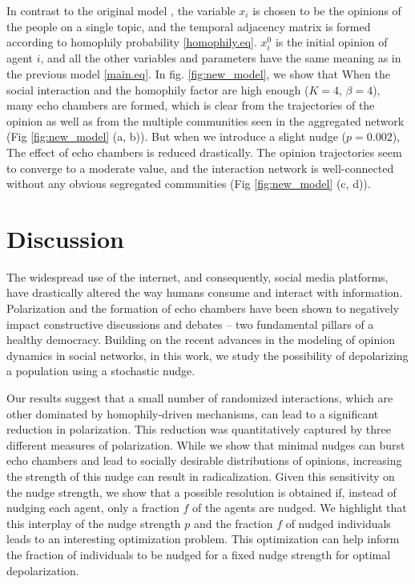 \documentclass[%
 reprint,
superscriptaddress,
 amsmath,amssymb,
 aps,
 pre,
]{revtex4-1}
\begin{document}
In contrast to the original model \cite{modeling-explosive-opinion-depolarization-in-interdependent-topics}, the variable $x_i$ is chosen to be the opinions of the people on a single topic, and the temporal adjacency matrix is formed according to homophily probability \ref{homophily.eq}. $x_i^0$ is the initial opinion of agent $i$, and all the other variables and parameters have the same meaning as in the previous model \ref{main.eq}. In fig. \ref{fig:new_model}, we show that When the social interaction and the homophily factor are high enough ($K = 4$, $\beta = 4$), many echo chambers are formed, which is clear from the trajectories of the opinion as well as from the multiple communities seen in the aggregated network (Fig \ref{fig:new_model} (a, b)). But when we introduce a slight nudge ($p = 0.002$), The effect of echo chambers is reduced drastically. The opinion trajectories seem to converge to a moderate value, and the interaction network is well-connected without any obvious segregated communities (Fig \ref{fig:new_model} (c, d)).

\section{Discussion}

The widespread use of the internet, and consequently, social media platforms, have drastically altered the way humans consume and interact with information. Polarization and the formation of echo chambers have been shown to negatively impact constructive discussions and debates -- two fundamental pillars of a healthy democracy. Building on the recent advances in the modeling of opinion dynamics in social networks, in this work, we study the possibility of depolarizing a population using a stochastic nudge. 

Our results suggest that a small number of randomized interactions, which are other dominated by homophily-driven mechanisms, can lead to a significant reduction in polarization. This reduction was quantitatively captured by three different measures of polarization. While we show that minimal nudges can burst echo chambers and lead to socially desirable distributions of opinions, increasing the strength of this nudge can result in radicalization. Given this sensitivity on the nudge strength, we show that a possible resolution is obtained if, instead of nudging each agent, only a fraction $f$ of the agents are nudged. We highlight that this interplay of the nudge strength $p$ and the fraction $f$ of nudged individuals leads to an interesting optimization problem. This optimization can help inform the fraction of individuals to be nudged for a fixed nudge strength for optimal depolarization.
\end{document}
